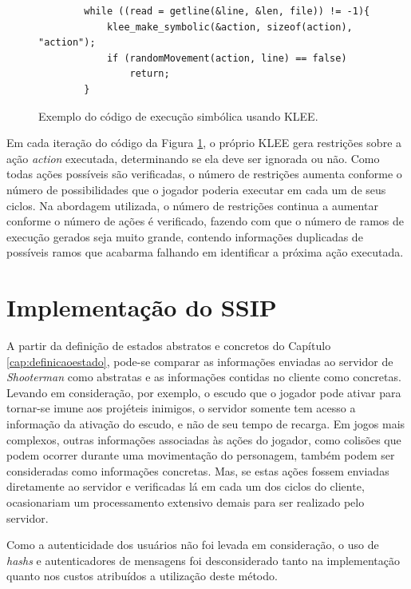 \begin{figure}[h!]
    \begin{lstlisting}
        while ((read = getline(&line, &len, file)) != -1){
            klee_make_symbolic(&action, sizeof(action), "action");
            if (randomMovement(action, line) == false)
                return;
        }
    \end{lstlisting}
    \caption{Exemplo do código de execução simbólica usando KLEE.}
    \label{fig:clienteCodeSimbolica}  

\end{figure}

Em cada iteração do código da Figura \ref{fig:clienteCodeSimbolica}, o próprio KLEE gera restrições sobre a ação \textit{action} executada, determinando se ela deve ser ignorada ou não. Como todas ações possíveis são verificadas, o número de restrições aumenta conforme o número de possibilidades que o jogador poderia executar em cada um de seus ciclos. Na abordagem utilizada, o número de restrições continua a aumentar conforme o número de ações é verificado, fazendo com que o número de ramos de execução gerados seja muito grande, contendo informações duplicadas de possíveis ramos que acabarma falhando em identificar a próxima ação executada. 


\section{Implementação do SSIP}
\label{implementsemantic}

A partir da definição de estados abstratos e concretos do Capítulo \ref{cap:definicaoestado}, pode-se comparar as informações enviadas ao servidor de \textit{Shooterman} como abstratas e as informações contidas no cliente como concretas. Levando em consideração, por exemplo, o escudo que o jogador pode ativar para tornar-se imune aos projéteis inimigos, o servidor somente tem acesso a informação da ativação do escudo, e não de seu tempo de recarga. Em jogos mais complexos, outras informações associadas às ações do jogador, como colisões que podem ocorrer durante uma movimentação do personagem, também podem ser consideradas como informações concretas. Mas, se estas ações fossem enviadas diretamente ao servidor e verificadas lá em cada um dos ciclos do cliente, ocasionariam um processamento extensivo demais para ser realizado pelo servidor. 

Como a autenticidade dos usuários não foi levada em consideração, o uso de \textit{hashs} e autenticadores de mensagens foi desconsiderado tanto na implementação quanto nos custos atribuídos a utilização deste método. 


